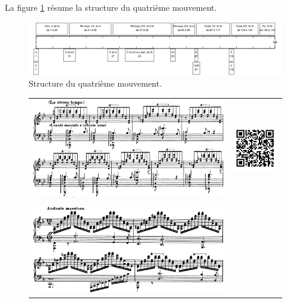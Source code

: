 La figure \ref{schema-4} résume la structure du quatrième mouvement.

\begin{figure}[!ht]
  \begin{bigcenter}
    \includegraphics[width=17.5cm, keepaspectratio]{frise-mvt4.png}
  \end{bigcenter}
  \caption{\label{schema-4}Structure du quatrième mouvement.}
\end{figure}

\begin{figure}[!p]
  \begin{bigcenter}
    \begin{tabular}{lr}
      \vspace*{0.0cm}
      \includegraphics[width=12.5cm, keepaspectratio]{mazeppa.png}
      &
      \includegraphics[width=3cm, keepaspectratio]{mazeppa-qr.png}
      \\
      \vspace{0.5cm} &
      \\
      \includegraphics[width=12.5cm, keepaspectratio]{sonate-coda.png}

\end{tabular}
\end{bigcenter}
\end{figure}
